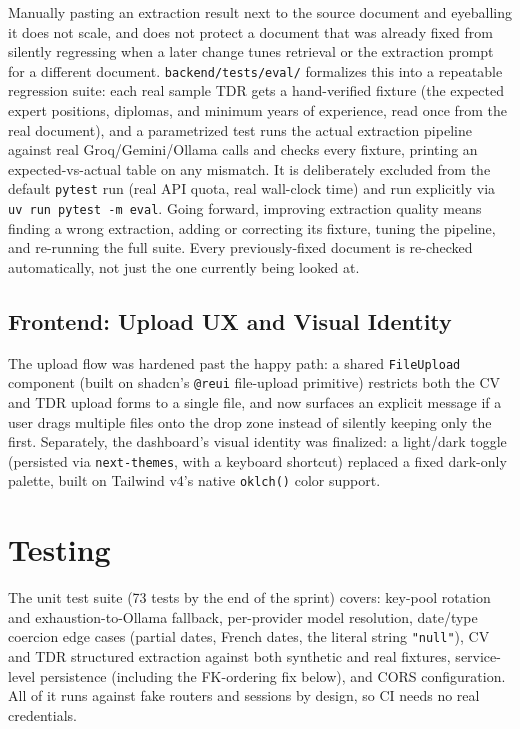 Manually pasting an extraction result next to the source document and
eyeballing it does not scale, and does not protect a document that was
already fixed from silently regressing when a later change tunes retrieval
or the extraction prompt for a different document. \texttt{backend/tests/eval/}
formalizes this into a repeatable regression suite: each real sample TDR
gets a hand-verified fixture (the expected expert positions, diplomas, and
minimum years of experience, read once from the real document), and a
parametrized test runs the actual extraction pipeline against real
Groq/Gemini/Ollama calls and checks every fixture, printing an
expected-vs-actual table on any mismatch. It is deliberately excluded from
the default \texttt{pytest} run (real API quota, real wall-clock time) and
run explicitly via \texttt{uv run pytest -m eval}. Going forward, improving
extraction quality means finding a wrong extraction, adding or correcting
its fixture, tuning the pipeline, and re-running the full suite. Every
previously-fixed document is re-checked automatically, not just the one
currently being looked at.

\subsection{Frontend: Upload UX and Visual Identity}

The upload flow was hardened past the happy path: a shared
\texttt{FileUpload} component (built on shadcn's \texttt{@reui} file-upload
primitive) restricts both the CV and TDR upload forms to a single file,
and now surfaces an explicit message if a user drags multiple files onto
the drop zone instead of silently keeping only the first. Separately, the
dashboard's visual identity was finalized: a light/dark toggle (persisted
via \texttt{next-themes}, with a keyboard shortcut) replaced a fixed
dark-only palette, built on Tailwind v4's native \texttt{oklch()} color
support.

\section{Testing}
\label{sec:s1-testing}

The unit test suite (73 tests by the end of the sprint) covers: key-pool
rotation and exhaustion-to-Ollama fallback, per-provider model resolution,
date/type coercion edge cases (partial dates, French dates, the literal
string \texttt{"null"}), CV and TDR structured extraction against both
synthetic and real fixtures, service-level persistence (including the
FK-ordering fix below), and CORS configuration. All of it runs against
fake routers and sessions by design, so CI needs no real credentials.

